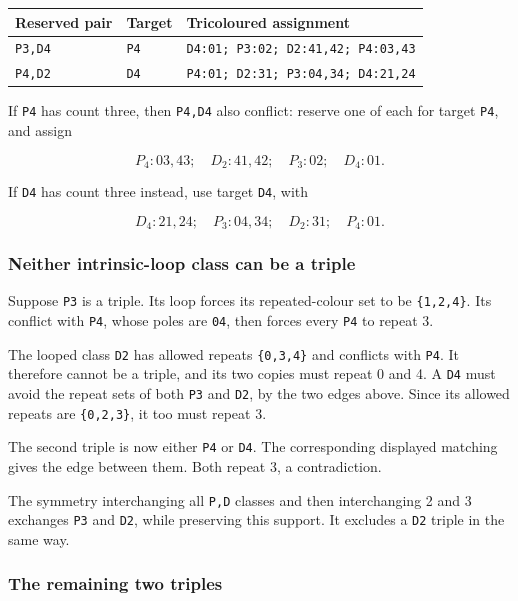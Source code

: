 \documentclass[
  10pt,
]{article}
\begin{document}
\begin{longtable}[]{@{}lll@{}}
\toprule\noalign{}
Reserved pair & Target & Tricoloured assignment \\
\midrule\noalign{}
\endhead
\bottomrule\noalign{}
\endlastfoot
\texttt{P3,D4} & \texttt{P4} &
\texttt{D4:01;\ P3:02;\ D2:41,42;\ P4:03,43} \\
\texttt{P4,D2} & \texttt{D4} &
\texttt{P4:01;\ D2:31;\ P3:04,34;\ D4:21,24} \\
\end{longtable}

If \texttt{P4} has count three, then \texttt{P4,D4} also conflict:
reserve one of each for target \texttt{P4}, and assign

\[
P_4:03,43;\quad D_2:41,42;\quad P_3:02;\quad D_4:01.
\]

If \texttt{D4} has count three instead, use target \texttt{D4}, with

\[
D_4:21,24;\quad P_3:04,34;\quad D_2:31;\quad P_4:01.
\]

\hypertarget{neither-intrinsic-loop-class-can-be-a-triple}{%
\subsubsection*{Neither intrinsic-loop class can be a
triple}\label{neither-intrinsic-loop-class-can-be-a-triple}}

Suppose \texttt{P3} is a triple. Its loop forces its repeated-colour set
to be \texttt{\{1,2,4\}}. Its conflict with \texttt{P4}, whose poles are
\texttt{04}, then forces every \texttt{P4} to repeat 3.

The looped class \texttt{D2} has allowed repeats \texttt{\{0,3,4\}} and
conflicts with \texttt{P4}. It therefore cannot be a triple, and its two
copies must repeat 0 and 4. A \texttt{D4} must avoid the repeat sets of
both \texttt{P3} and \texttt{D2}, by the two edges above. Since its
allowed repeats are \texttt{\{0,2,3\}}, it too must repeat 3.

The second triple is now either \texttt{P4} or \texttt{D4}. The
corresponding displayed matching gives the edge between them. Both
repeat 3, a contradiction.

The symmetry interchanging all \texttt{P,D} classes and then
interchanging 2 and 3 exchanges \texttt{P3} and \texttt{D2}, while
preserving this support. It excludes a \texttt{D2} triple in the same
way.

\hypertarget{the-remaining-two-triples}{%
\subsubsection*{The remaining two
triples}\label{the-remaining-two-triples}}
\end{document}
